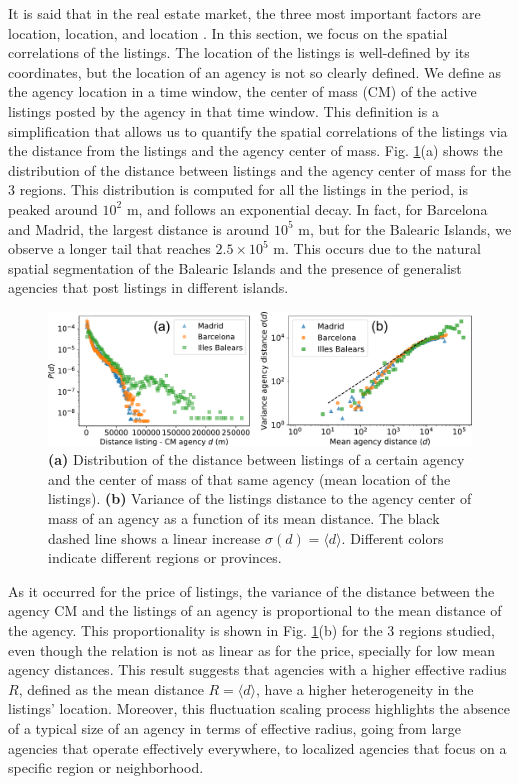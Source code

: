 It is said that in the real estate market, the three most important factors are location, location, and location \cite{rosen1974hedonic}. In this section, we focus on the spatial correlations of the listings. The location of the listings is well-defined by its coordinates, but the location of an agency is not so clearly defined. We define as the agency location in a time window, the center of mass (CM) of the active listings posted by the agency in that time window. This definition is a simplification that allows us to quantify the spatial correlations of the listings via the distance from the listings and the agency center of mass. Fig. \ref{fig:distance_panel}(a) shows the distribution of the distance between listings and the agency center of mass for the 3 regions. This distribution is computed for all the listings in the period, is peaked around $10^2$ m, and follows an exponential decay. In fact, for Barcelona and Madrid, the largest distance is around $10^5$ m, but for the Balearic Islands, we observe a longer tail that reaches $2.5 \times 10^5$ m. This occurs due to the natural spatial segmentation of the Balearic Islands and the presence of generalist agencies that post listings in different islands.

\begin{figure}
    \centering
    \includegraphics[width =\textwidth]{Figs/Idealista_dynamics/distance_panel.pdf}
	\caption[Distance correlations.]{\textbf{(a)} Distribution of the distance between listings of a certain agency and the center of mass of that same agency (mean location of the listings). \textbf{(b)} Variance of the listings distance to the agency center of mass of an agency as a function of its mean distance. The black dashed line shows a linear increase $\sigma(d) = \langle d \rangle$. Different colors indicate different regions or provinces. \label{fig:distance_panel}}
\end{figure}

As it occurred for the price of listings, the variance of the distance between the agency CM and the listings of an agency is proportional to the mean distance of the agency. This proportionality is shown in Fig. \ref{fig:distance_panel}(b) for the 3 regions studied, even though the relation is not as linear as for the price, specially for low mean agency distances. This result suggests that agencies with a higher effective radius $R$, defined as the mean distance $R = \langle d \rangle$, have a higher heterogeneity in the listings' location. Moreover, this fluctuation scaling process highlights the absence of a typical size of an agency in terms of  effective radius, going from large agencies that operate effectively everywhere, to localized agencies that focus on a specific region or neighborhood.

